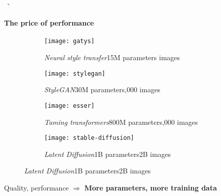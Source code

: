 \documentclass[aspectratio=169, 22pt]{beamer}
\begin{document}
\begin{frame}{\secname~- \subsecname}
  \framesubtitle{The price of performance}
  \begin{figure}
    \begin{subfigure}[t]{0.24\linewidth}\centering
      \texttt{[image: gatys]}
      \caption{{\emph{Neural style transfer}\newline[Gatys et al., 2016]\newline 15M parameters images}}
    \end{subfigure}
    \begin{subfigure}[t]{0.24\linewidth}\centering
      \texttt{[image: stylegan]}                
      \caption{{\emph{StyleGAN}\newline[Karras et al., 2019]\newline 30M parameters,000 images}}
    \end{subfigure}
    \begin{subfigure}[t]{0.24\linewidth}\centering
      \texttt{[image: esser]}                      
      \caption{\emph{Taming transformers}\newline[Esser et al., 2021]\newline 800M parameters,000 images}
    \end{subfigure}
    \begin{subfigure}[t]{0.24\linewidth}\centering
      \texttt{[image: stable-diffusion]}
      \caption{\emph{Latent Diffusion}\newline[Rombach et al., 2022]\newline 1B parameters\newline 2B images}
    \end{subfigure}
  \end{figure}
  \begin{exampleblock}{}
    Quality, performance $\Rightarrow$ \textbf{More \alert{parameters}, more training \alert{data}}
  \end{exampleblock}
\end{frame}
\end{document}
